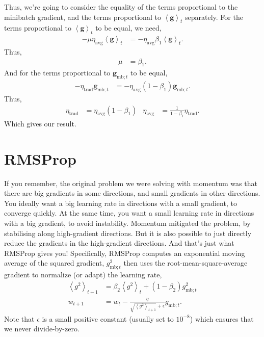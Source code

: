 \documentclass{article}
\newcommand{\bracket}[3]{\left#1 #3 \right#2}
\newcommand{\ab}{\bracket{\langle}{\rangle}}
\newcommand{\0}{\mathbf{0}}
\newcommand{\g}{\mathbf{g}}
\newcommand{\gmbt}{\g_{\text{mb}; t}}
\newcommand{\gsmbt}{g_{\text{mb}; t}}
\newcommand{\vh}{\hat{v}}
\newcommand{\gb}{\mathbf{\ab{g}}}
\newcommand{\gssqb}{\ab{g^2}}
\newcommand{\lrtrad}{\eta_\text{trad}}
\newcommand{\lravg}{\eta_\text{avg}}
\begin{document}
Thus, we're going to consider the equality of the terms proportional to the minibatch gradient, and the terms proportional to $\gb_t$ separately.
For the terms proportional to $\gb_t$ to be equal, we need,
\begin{align}
  - \mu \lravg \gb_{t} &= - \lravg \beta_1 \gb_t.
\end{align}
Thus,
\begin{align}
  \mu &= \beta_1.
\end{align}
And for the terms proportional to $\gmbt$ to be equal,
\begin{align}
  - \lrtrad \gmbt &= - \lravg (1-\beta_1) \gmbt.
\end{align}
Thus,
\begin{align}
  \lrtrad &= \lravg (1-\beta_1) & 
  \lravg &= \tfrac{1}{1 -\beta_1} \lrtrad.
\end{align}
Which gives our result.

\section{RMSProp}

If you remember, the original problem we were solving with momentum was that there are big gradients in some directions, and small gradients in other directions.
You ideally want a big learning rate in directions with a small gradient, to converge quickly.
At the same time, you want a small learning rate in directions with a big gradient, to avoid instability.
Momentum mitigated the problem, by stabilising along high-gradient directions.
But it is also possible to just directly reduce the gradients in the high-gradient directions.
And that's just what RMSProp gives you!
Specifically, RMSProp computes an exponential moving average of the squared gradient, $\gsmbt^2$ then uses the root-mean-square-average gradient to normalize (or adapt) the learning rate,
\begin{align}
  \gssqb_{t+1} &= \beta_2 \gssqb_{t} + (1-\beta_2) \gsmbt^2\\
  \label{eq:rmsprop:w}
  w_{t+1} &= w_t - \frac{\eta}{\sqrt{\gssqb_{t+1}} + \epsilon}\gsmbt.
\end{align}
Note that $\epsilon$ is a small positive constant (usually set to $10^{-8}$) which ensures that we never divide-by-zero.
\end{document}
